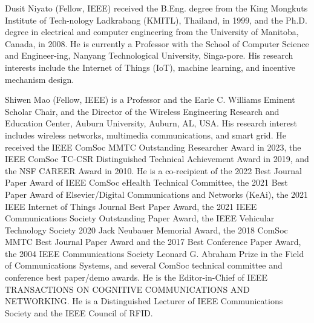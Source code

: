 \documentclass[10pt,journal,compsoc]{IEEEtran}
\begin{document}
\vspace{-10 mm}
\begin{IEEEbiography}{Dusit Niyato}
(Fellow, IEEE) received the B.Eng. degree from the King Mongkuts Institute of Tech-nology Ladkrabang (KMITL), Thailand, in 1999, and the Ph.D. degree in electrical and computer engineering from the University of Manitoba, Canada, in 2008. He is currently a Professor with the School of Computer Science and Engineer-ing, Nanyang Technological University, Singa-pore. His research interests include the Internet of Things (IoT), machine learning, and incentive mechanism design.
\end{IEEEbiography}

\vspace{-10 mm}
\begin{IEEEbiography}{Shiwen Mao}
(Fellow, IEEE) is a Professor and the Earle C. Williams Eminent Scholar Chair, and the Director of the Wireless Engineering Research and Education Center, Auburn University, Auburn, AL, USA. His research interest includes wireless networks, multimedia communications, and smart grid. He received the IEEE ComSoc MMTC Outstanding Researcher Award in 2023, the IEEE ComSoc TC-CSR Distinguished Technical Achievement Award in 2019, and the NSF CAREER Award in 2010. He is a co-recipient of the 2022 Best Journal Paper Award of IEEE ComSoc eHealth Technical Committee, the 2021 Best Paper Award of Elsevier/Digital Communications and Networks (KeAi), the 2021 IEEE Internet of Things Journal Best Paper Award, the 2021 IEEE Communications Society Outstanding Paper Award, the IEEE Vehicular Technology Society 2020 Jack Neubauer Memorial Award, the 2018 ComSoc MMTC Best Journal Paper Award and the 2017 Best Conference Paper Award, the 2004 IEEE Communications Society Leonard G. Abraham Prize in the Field of Communications Systems, and several ComSoc technical committee and conference best paper/demo awards. He is the Editor-in-Chief of IEEE TRANSACTIONS ON COGNITIVE COMMUNICATIONS AND NETWORKING. He is a Distinguished Lecturer of IEEE Communications Society and the IEEE Council of RFID.
\end{IEEEbiography}
\end{document}
